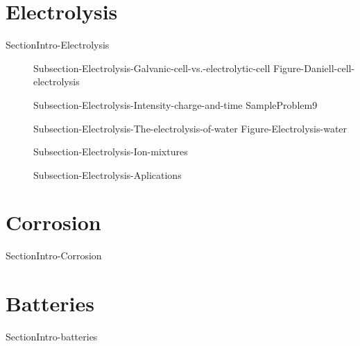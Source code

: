 \documentclass[main.tex]{subfiles}
\begin{document}
 \section{Electrolysis}{SectionIntro-Electrolysis}
\sloppy\begin{description}
    \item[] {Subsection-Electrolysis-Galvanic-cell-vs.-electrolytic-cell}
{Figure-Daniell-cell-electrolysis}
     \item[] {Subsection-Electrolysis-Intensity-charge-and-time}
     {SampleProblem9}
     \item[] {Subsection-Electrolysis-The-electrolysis-of-water}
{Figure-Electrolysis-water}\vspace{3cm}
     \item[] {Subsection-Electrolysis-Ion-mixtures}

     \item[] {Subsection-Electrolysis-Aplications}

\end{description}


 \section{Corrosion}{SectionIntro-Corrosion}
 \section{Batteries}{SectionIntro-batteries}
\end{document}
